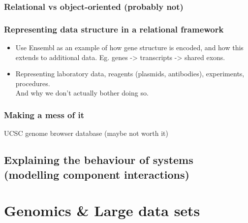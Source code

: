 \documentclass{scrartcl}
\begin{document}
\subsubsection{Relational vs object-oriented (probably not)}
\label{sec-4-8-3}
\subsubsection{Representing data structure in a relational framework}
\label{sec-4-8-4}

\begin{itemize}
\item Use Ensembl as an example of how gene structure is encoded, and how this extends
  to additional data. Eg. genes -> transcripts -> shared exons.
\item Representing laboratory data, reagents (plasmids, antibodies), experiments, procedures.\\
And why we don't actually bother doing so.
\end{itemize}
\subsubsection{Making a mess of it}
\label{sec-4-8-5}

UCSC genome browser database (maybe not worth it)
\subsection{Explaining the behaviour of systems (modelling component interactions)}
\label{sec-4-9}
\section{Genomics \& Large data sets}
\label{sec-5}
\end{document}
